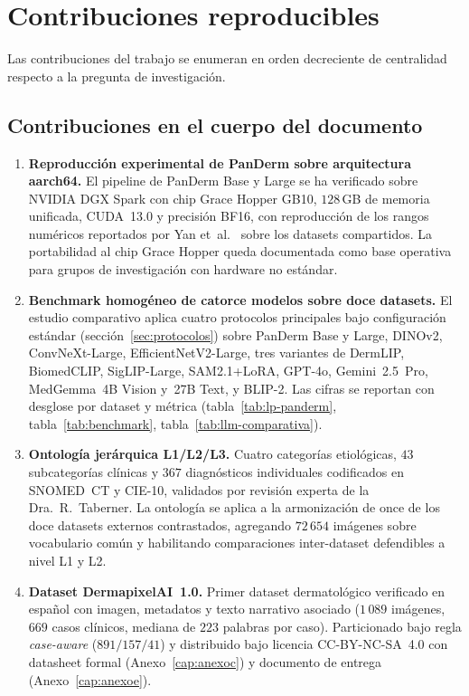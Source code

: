 \section{Contribuciones reproducibles}
\label{sec:contribuciones}

Las contribuciones del trabajo se enumeran en orden decreciente
de centralidad respecto a la pregunta de investigación.

\subsection{Contribuciones en el cuerpo del documento}
\label{sec:contrib-cuerpo}

\begin{enumerate}
\item \textbf{Reproducción experimental de PanDerm sobre
arquitectura aarch64.} El pipeline de PanDerm Base y Large se ha
verificado sobre NVIDIA DGX Spark con chip Grace Hopper GB10,
$128$\,GB de memoria unificada, CUDA~13.0 y precisión BF16, con
reproducción de los rangos numéricos reportados por
Yan et~al.~\cite{panderm2025} sobre los datasets compartidos. La
portabilidad al chip Grace Hopper queda documentada como base
operativa para grupos de investigación con hardware no estándar.

\item \textbf{Benchmark homogéneo de catorce modelos sobre doce
datasets.} El estudio comparativo aplica cuatro protocolos
principales bajo configuración estándar
(secci\'on~\ref{sec:protocolos}) sobre PanDerm Base y Large, DINOv2,
ConvNeXt-Large, EfficientNetV2-Large, tres variantes de DermLIP,
BiomedCLIP, SigLIP-Large, SAM2.1+LoRA, GPT-4o, Gemini~2.5~Pro,
MedGemma~4B Vision y~27B Text, y BLIP-2. Las cifras se reportan
con desglose por dataset y métrica
(tabla~\ref{tab:lp-panderm}, tabla~\ref{tab:benchmark},
tabla~\ref{tab:llm-comparativa}).

\item \textbf{Ontología jerárquica L1/L2/L3.} Cuatro categorías
etiológicas, $43$ subcategorías clínicas y $367$
diagnósticos individuales codificados en SNOMED~CT y CIE-10,
validados por revisión experta de la Dra.~R.~Taberner. La
ontología se aplica a la armonización de once de los doce
datasets externos contrastados, agregando $72\,654$ imágenes
sobre vocabulario común y habilitando comparaciones inter-dataset
defendibles a nivel L1 y L2.

\item \textbf{Dataset DermapixelAI~1.0.} Primer dataset
dermatológico verificado en español con imagen, metadatos y texto
narrativo asociado ($1\,089$ imágenes, $669$ casos clínicos,
mediana de $223$ palabras por caso). Particionado bajo regla
\emph{case-aware} ($891 / 157 / 41$) y distribuido bajo
licencia CC-BY-NC-SA~4.0 con datasheet formal
(Anexo~\ref{cap:anexoc}) y documento de entrega
(Anexo~\ref{cap:anexoe}).


\end{enumerate}
